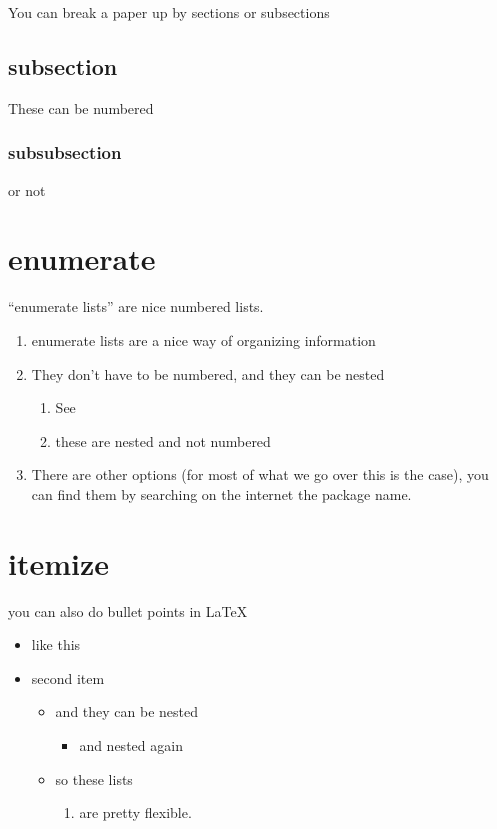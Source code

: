 \documentclass[12pt]{article} %
\begin{document}
You can break a paper up by sections or subsections

\subsection{subsection}

These can be numbered 

\subsubsection*{subsubsection}
or not

\section{enumerate}

``enumerate lists'' are nice numbered lists. %

\begin{enumerate}
\item enumerate lists are a nice way of organizing information
\item They don't have to be numbered, and they can be nested
  \begin{enumerate}
  \item See
  \item these are nested and not numbered
  \end{enumerate}
\item There are other options (for most of what we go over this is the
  case), you can find them by searching on the internet the package name. 
\end{enumerate}

\section{itemize}
you can also do bullet points in \LaTeX

\begin{itemize}
\item like this
\item second item
  \begin{itemize}
  \item and they can be nested
    \begin{itemize}
    \item and nested again
    \end{itemize}
\item so these lists 
\begin{enumerate}
\item are pretty flexible. 
\end{enumerate}
  \end{itemize}
\end{itemize}
\end{document}
